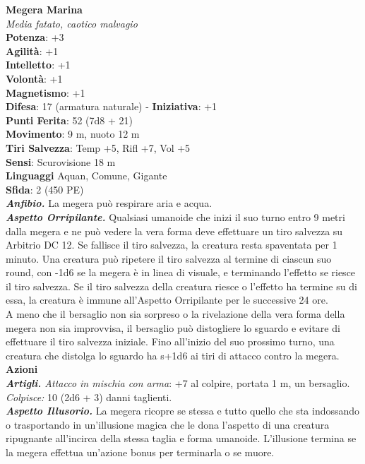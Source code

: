 \begin{multicols}{2}
\medskip\textbf{Megera Marina}\\
\emph{Media fatato, caotico malvagio}\\
\textbf{Potenza}: +3\\
\textbf{Agilità}: +1\\
\textbf{Intelletto}: +1\\
\textbf{Volontà}: +1\\
\textbf{Magnetismo}: +1\\
\textbf{Difesa}: 17 (armatura naturale) - \textbf{Iniziativa}: +1\\
\textbf{Punti Ferita}: 52 (7d8 + 21)\\
\textbf{Movimento}: 9 m, nuoto 12 m\\
\textbf{Tiri Salvezza}: Temp +5, Rifl +7, Vol +5\\
\textbf{Sensi}: Scurovisione 18 m\\
\textbf{Linguaggi} Aquan, Comune, Gigante\\
\textbf{Sfida}: 2 (450 PE)\smallskip\\
\emph{\textbf{Anfibio.}} La megera può respirare aria e acqua.\\
\emph{\textbf{Aspetto Orripilante.}} Qualsiasi umanoide che inizi il suo turno entro 9 metri dalla megera e ne può vedere la vera forma deve effettuare un tiro salvezza su Arbitrio DC  12. Se fallisce il tiro salvezza, la creatura resta spaventata per 1 minuto. Una creatura può ripetere il tiro salvezza al termine di ciascun suo round, con -1d6 se la megera è in linea di visuale, e terminando l'effetto se riesce il tiro salvezza. Se il tiro salvezza della creatura riesce o l'effetto ha termine su di essa, la creatura è immune all'Aspetto Orripilante per le successive 24 ore.\\
A meno che il bersaglio non sia sorpreso o la rivelazione della vera forma della megera non sia improvvisa, il bersaglio può distogliere lo sguardo e evitare di effettuare il tiro salvezza iniziale. Fino all'inizio del suo prossimo turno, una creatura che distolga lo sguardo ha s+1d6 ai tiri di attacco contro la megera.\\
\smallskip\textbf{Azioni}\\
\emph{\textbf{Artigli.} Attacco in mischia con arma}: +7 al colpire, portata 1 m, un bersaglio.\\
\emph{Colpisce:} 10 (2d6 + 3) danni taglienti.\\
\emph{\textbf{Aspetto Illusorio.}} La megera ricopre se stessa e tutto quello che sta indossando o trasportando in un'illusione magica che le dona l'aspetto di una creatura ripugnante all'incirca della stessa taglia e forma umanoide. L'illusione termina se la megera effettua un'azione bonus per terminarla o se muore.\\


\end{multicols}
